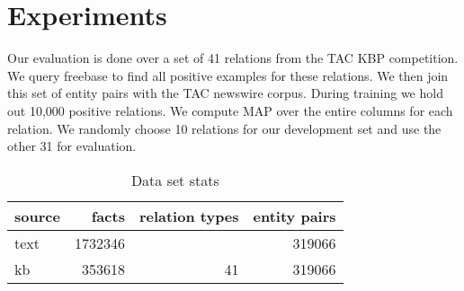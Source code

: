 \section{Experiments}

Our evaluation is done over a set of 41 relations from the TAC KBP competition.
We query freebase to find all positive examples for these relations.
We then join this set of entity pairs with the TAC newswire corpus.
During training we hold out 10,000 positive relations.
We compute MAP over the entire columns for each relation.
We randomly choose 10 relations for our development set and use the other 31 for evaluation.


\begin{table}[h!]
\setlength{\tabcolsep}{4.1pt}
\begin{center}
\begin{tabular}{|l|r|r|r|}
\hline
\bf source & facts & relation types & entity pairs \\
\hline\hline
text & 1732346 & & 319066  \\
\hline
kb & 353618 & 41 & 319066 \\
\hline

\hline
\end{tabular}
\caption{Data set stats
\label{data stats}}
\end{center}
\vspace{-.3cm}
\end{table}
